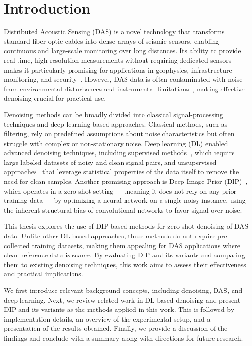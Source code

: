 \chapter{Introduction}

Distributed Acoustic Sensing (DAS) is a novel technology that transforms standard fiber-optic cables into dense arrays of seismic sensors, enabling continuous and large-scale monitoring over long distances.
Its ability to provide real-time, high-resolution measurements without requiring dedicated sensors makes it particularly promising for applications in geophysics, infrastructure monitoring, and security~\cite{SelfMixed,DAS-N2N}.
However, DAS data is often contaminated with noise from environmental disturbances and instrumental limitations~\cite{IDF}, making effective denoising crucial for practical use.

Denoising methods can be broadly divided into classical signal-processing techniques and deep-learning-based approaches. Classical methods, such as filtering, rely on predefined assumptions about noise characteristics but often struggle with complex or non-stationary noise.
Deep learning (DL) enabled advanced denoising techniques, including supervised methods~\cite{DnCNN,N2N}, which require large labeled datasets of noisy and clean signal pairs, and unsupervised approaches~\cite{Noisier2Noise,N2V,N2S} that leverage statistical properties of the data itself to remove the need for clean samples.
Another promising approach is Deep Image Prior (DIP)~\cite{DIP}, which operates in a zero-shot setting --- meaning it does not rely on any prior training data --- by optimizing a neural network on a single noisy instance, using the inherent structural bias of convolutional networks to favor signal over noise.

This thesis explores the use of DIP-based methods for zero-shot denoising of DAS data.
Unlike other DL-based approaches, these methods do not require pre-collected training datasets, making them appealing for DAS applications where clean reference data is scarce.
By evaluating DIP and its variants and comparing them to existing denoising techniques, this work aims to assess their effectiveness and practical implications.

We first introduce relevant background concepts, including denoising, DAS, and deep learning.
Next, we review related work in DL-based denoising and present DIP and its variants as the methods applied in this work. This is followed by implementation details, an overview of the experimental setup, and a presentation of the results obtained.
Finally, we provide a discussion of the findings and conclude with a summary along with directions for future research.
